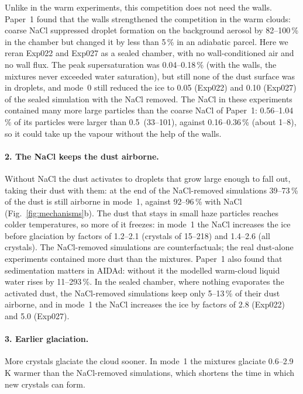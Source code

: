 Unlike in the warm experiments, this competition does not need the walls. Paper~1 found that the walls strengthened the competition in the warm clouds: coarse NaCl suppressed droplet formation on the background aerosol by 82--100\,\% in the chamber but changed it by less than 5\,\% in an adiabatic parcel. Here we reran Exp022 and Exp027 as a sealed chamber, with no wall-conditioned air and no wall flux. The peak supersaturation was 0.04--0.18\,\% (with the walls, the mixtures never exceeded water saturation), but still none of the dust surface was in droplets, and mode~0 still reduced the ice to 0.05 (Exp022) and 0.10 (Exp027) of the sealed simulation with the NaCl removed. The NaCl in these experiments contained many more large particles than the coarse NaCl of Paper~1: 0.56--1.04\,\% of its particles were larger than 0.5\um\ (33--101\cmc), against 0.16--0.36\,\% (about 1--8\cmc), so it could take up the vapour without the help of the walls.

\paragraph{2. The NaCl keeps the dust airborne.} Without NaCl the dust activates to droplets that grow large enough to fall out, taking their dust with them: at the end of the NaCl-removed simulations 39--73\,\% of the dust is still airborne in mode~1, against 92--96\,\% with NaCl (Fig.~\ref{fig:mechanisms}b). The dust that stays in small haze particles reaches colder temperatures, so more of it freezes: in mode~1 the NaCl increases the ice before glaciation by factors of 1.2--2.1 (crystals of 15--218\um) and 1.4--2.6 (all crystals). The NaCl-removed simulations are counterfactuals; the real dust-alone experiments contained more dust than the mixtures. Paper~1 also found that sedimentation matters in AIDAd: without it the modelled warm-cloud liquid water rises by 11--293\,\%. In the sealed chamber, where nothing evaporates the activated dust, the NaCl-removed simulations keep only 5--13\,\% of their dust airborne, and in mode~1 the NaCl increases the ice by factors of 2.8 (Exp022) and 5.0 (Exp027).

\paragraph{3. Earlier glaciation.} More crystals glaciate the cloud sooner. In mode~1 the mixtures glaciate 0.6--2.9\,K warmer than the NaCl-removed simulations, which shortens the time in which new crystals can form.

